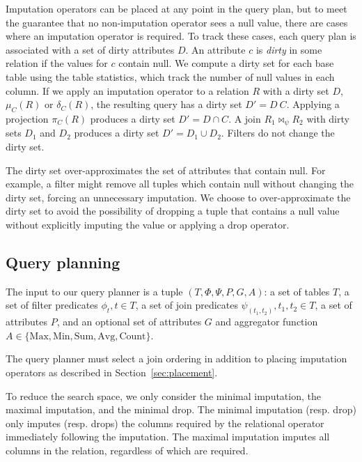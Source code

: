 Imputation operators can be placed at any point in the query plan, but to meet the guarantee that no non-imputation operator sees a null value, there are cases where an imputation operator is required. To track these cases, each query plan is associated with a set of dirty attributes $D$. An attribute $c$ is \emph{dirty} in some relation if the values for $c$ contain null. We compute a dirty set for each base table using the table statistics, which track the number of null values in each column. If we apply an imputation operator to a relation $R$ with a dirty set $D$, $\mu_C (R)$ or $\delta_C (R)$, the resulting query has a dirty set $D' = D \ C$.  Applying a projection $\pi_C(R)$ produces a dirty set $D' = D \cap C$. A join $R_1 \Join_\psi R_2$ with dirty sets $D_1$ and $D_2$  produces a dirty set $D' = D_1 \cup D_2$.  Filters do not change the dirty set. 

The dirty set over-approximates the set of attributes that contain null. For example, a filter might remove all tuples which contain null without changing the dirty set, forcing an unnecessary imputation. We choose to over-approximate the dirty set to avoid the possibility of dropping a tuple that contains a null value without explicitly imputing the value or applying a drop operator.

\subsection{Query planning}
The input to our query planner is a tuple $(T, \Phi, \Psi, P, G, A)$: a set of tables $T$, a set of filter predicates $\phi_t, t \in T$, a set of join predicates $\psi_(t_1, t_2), t_1, t_2 \in T$, a set of attributes $P$, and an optional set of attributes $G$ and aggregator function $A \in \{\text{Max}, \text{Min}, \text{Sum}, \text{Avg}, \text{Count}\}$.

The query planner must select a join ordering in addition to placing imputation operators as described in Section~\ref{sec:placement}.

To reduce the search space, we only consider the minimal imputation, the maximal imputation, and the minimal drop. The minimal imputation (resp. drop) only imputes (resp. drops) the columns required by the relational operator immediately following the imputation. The maximal imputation imputes all columns in the relation, regardless of which are required. 

